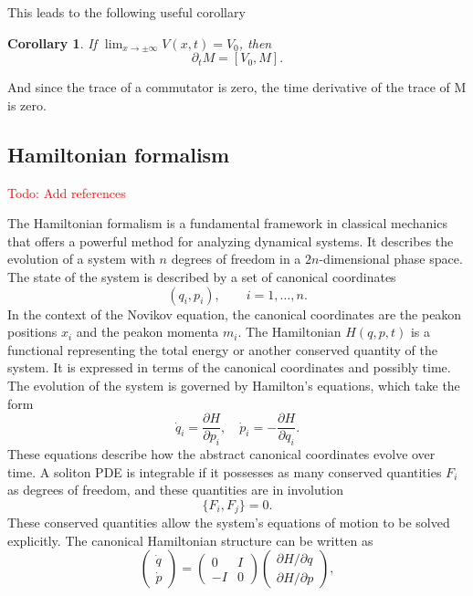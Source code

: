 \documentclass[english,master]{liumaiex}
\theoremstyle{plain}
\newtheorem{corollary}[proposition]{Corollary}
\theoremstyle{definition}
\newcommand\todo[1]{\textcolor{red}{#1}}
\begin{document}
This leads to the following useful corollary
\begin{corollary} \label{cor:Monodromy}
	If $\lim_{x \rightarrow \pm \infty} V(x,t) = V_0$, then
	\begin{equation}
		\partial_t M = [V_0, M].
	\end{equation}
\end{corollary}
And since the trace of a commutator is zero, the time derivative of the trace of M is zero.

\subsection{Hamiltonian formalism}
\todo{Todo: Add references}

The Hamiltonian formalism is a fundamental framework in classical mechanics that offers a powerful method for analyzing dynamical systems. It describes the evolution of a system with $n$ degrees of freedom in a $2n$-dimensional phase space. The state of the system is described by a set of canonical coordinates
\begin{equation}
	 (q_i,p_i), \qquad i = 1,\dots,n.
\end{equation}
In the context of the Novikov equation, the canonical coordinates are the peakon positions $x_i$ and the peakon momenta $m_i$. The Hamiltonian $H(q,p,t)$ is a functional representing the total energy or another conserved quantity of the system. It is expressed in terms of the canonical coordinates and possibly time. The evolution of the system is governed by Hamilton's equations, which take the form
%
\begin{equation}
	\dot{q}_i = \frac{\partial H}{\partial p_i}, \quad
	\dot{p}_i = -\frac{\partial H}{\partial q_i}.
\end{equation}
%
These equations describe how the abstract canonical coordinates evolve over time. A soliton PDE is integrable if it possesses as many conserved quantities $F_i$ as degrees of freedom, and these quantities are in involution
%
\begin{equation}
	\{F_i, F_j\} = 0.
\end{equation}
%
These conserved quantities allow the system's equations of motion to be solved explicitly. The canonical Hamiltonian structure can be written as
%
\begin{equation}
\begin{pmatrix}
	\dot{q} \\
	\dot{p}
\end{pmatrix} =
\begin{pmatrix}
	0 & I \\
	-I & 0
\end{pmatrix}
\begin{pmatrix}
	\partial H / \partial q \\
	\partial H / \partial p
\end{pmatrix},
\end{equation}
\end{document}

